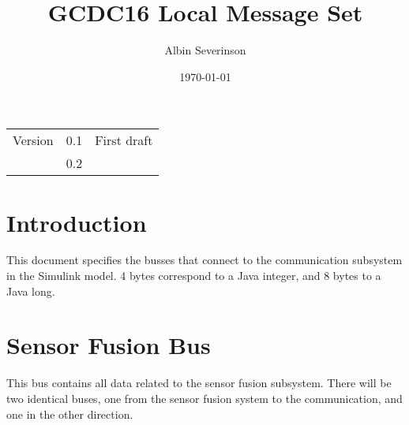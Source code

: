 \documentclass[11pt]{article}
\author{Albin Severinson}
\date{\today}
\title{GCDC16 Local Message Set}
\begin{document}
\maketitle
\tableofcontents

\begin{center}
\begin{tabular}{lrl}
Version & 0.1 & First draft\\
 & 0.2 & \\
\end{tabular}
\end{center}

\section{Introduction}
\label{sec:orgheadline1}
This document specifies the busses that connect to the communication
subsystem in the Simulink model. 4 bytes correspond to a Java integer,
and 8 bytes to a Java long.


\section{Sensor Fusion Bus}
\label{sec:orgheadline2}
This bus contains all data related to the sensor fusion subsystem.
There will be two identical buses, one from the sensor fusion system
to the communication, and one in the other direction. 
\end{document}

